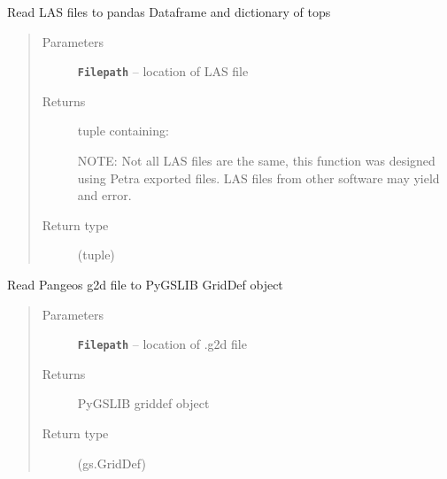 \documentclass[letterpaper,10pt,english]{sphinxmanual}
\begin{document}
\begin{fulllineitems}
\label{index:pygeos.io.read_LAS}
Read LAS files to pandas Dataframe and dictionary of tops
\begin{quote}\begin{description}
\item[{Parameters}] \leavevmode
\textbf{\texttt{Filepath}} -- location of LAS file

\item[{Returns}] \leavevmode

tuple containing:


NOTE: Not all LAS files are the same, this function was designed using Petra exported files.
LAS files from other software may yield and error.


\item[{Return type}] \leavevmode
(tuple)

\end{description}\end{quote}

\end{fulllineitems}


\begin{fulllineitems}
\label{index:pygeos.io.read_g2d}
Read Pangeos g2d file to PyGSLIB GridDef object
\begin{quote}\begin{description}
\item[{Parameters}] \leavevmode
\textbf{\texttt{Filepath}} -- location of .g2d file

\item[{Returns}] \leavevmode
PyGSLIB griddef object

\item[{Return type}] \leavevmode
(gs.GridDef)

\end{description}\end{quote}

\end{fulllineitems}
\end{document}
